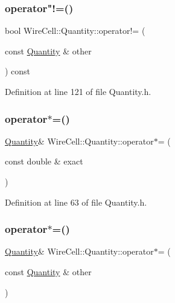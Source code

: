 \subsubsection{\texorpdfstring{operator"!=()}{operator!=()}}
{\footnotesize\ttfamily bool Wire\+Cell\+::\+Quantity\+::operator!= (\begin{DoxyParamCaption}\item[{const \hyperlink{class_wire_cell_1_1_quantity}{Quantity} \&}]{other }\end{DoxyParamCaption}) const\hspace{0.3cm}{\ttfamily [inline]}}



Definition at line 121 of file Quantity.\+h.

\mbox{\label{class_wire_cell_1_1_quantity_aded6da84658f13dcbffd9906bd86af8f}} 
\subsubsection{\texorpdfstring{operator$\ast$=()}{operator*=()}\hspace{0.1cm}{\footnotesize\ttfamily [1/2]}}
{\footnotesize\ttfamily \hyperlink{class_wire_cell_1_1_quantity}{Quantity}\& Wire\+Cell\+::\+Quantity\+::operator$\ast$= (\begin{DoxyParamCaption}\item[{const double \&}]{exact }\end{DoxyParamCaption})\hspace{0.3cm}{\ttfamily [inline]}}



Definition at line 63 of file Quantity.\+h.

\mbox{\label{class_wire_cell_1_1_quantity_ad2fea0539b7dc40f3d6264baf63059d5}} 
\subsubsection{\texorpdfstring{operator$\ast$=()}{operator*=()}\hspace{0.1cm}{\footnotesize\ttfamily [2/2]}}
{\footnotesize\ttfamily \hyperlink{class_wire_cell_1_1_quantity}{Quantity}\& Wire\+Cell\+::\+Quantity\+::operator$\ast$= (\begin{DoxyParamCaption}\item[{const \hyperlink{class_wire_cell_1_1_quantity}{Quantity} \&}]{other }\end{DoxyParamCaption})\hspace{0.3cm}{\ttfamily [inline]}}



